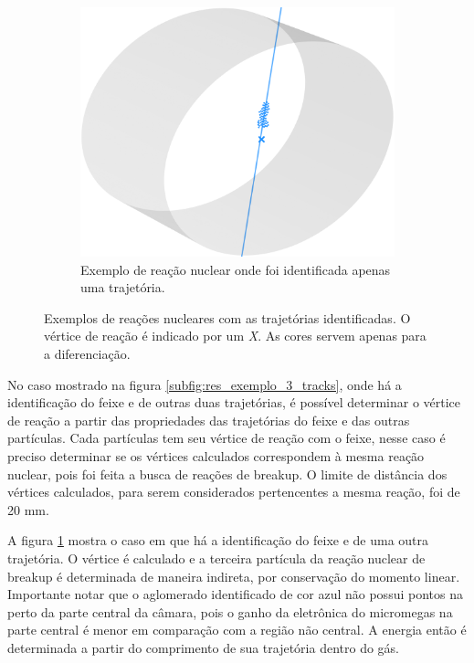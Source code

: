 \documentclass[a4paper,12pt,oneside]{book}
\begin{document}
\begin{figure}[H]
\begin{subfigure}[t]{0.45\textwidth}
        \label{subfig:res_exemplo_2_tracks}
    \end{subfigure}%
    \hspace{0.5cm}
    \begin{subfigure}[t]{0.45\textwidth}
        \centering
        \includegraphics[scale=0.4, width=.95\columnwidth]{figs/results_ex_1_track.png}
        \caption{Exemplo de reação nuclear onde foi identificada apenas uma trajetória.}
        \label{subfig:res_exemplo_1_track}
    \end{subfigure}
\caption{Exemplos de reações nucleares com as trajetórias identificadas. O vértice de reação é indicado por um \textit{X}. As cores servem apenas para a diferenciação.}
\label{fig:res_tracks}
\end{figure}

\par No caso mostrado na figura \ref{subfig:res_exemplo_3_tracks}, onde há a identificação do feixe e de outras duas trajetórias, é possível determinar o vértice de reação a partir das propriedades das trajetórias do feixe e das outras partículas. Cada partículas tem seu vértice de reação com o feixe, nesse caso é preciso determinar se os vértices calculados correspondem à mesma reação nuclear, pois foi feita a busca de reações de breakup. O limite de distância dos vértices calculados, para serem considerados pertencentes a mesma reação, foi de 20 mm.

\par A figura \ref{subfig:res_exemplo_2_tracks} mostra o caso em que há a identificação do feixe e de uma outra trajetória. O vértice é calculado e a terceira partícula da reação nuclear de breakup é determinada de maneira indireta, por conservação do momento linear. Importante notar que o aglomerado identificado de cor azul não possui pontos na perto da parte central da câmara, pois o ganho da eletrônica do micromegas na parte central é menor em comparação com a região não central. A energia então é determinada a partir do comprimento de sua trajetória dentro do gás.
\end{document}
